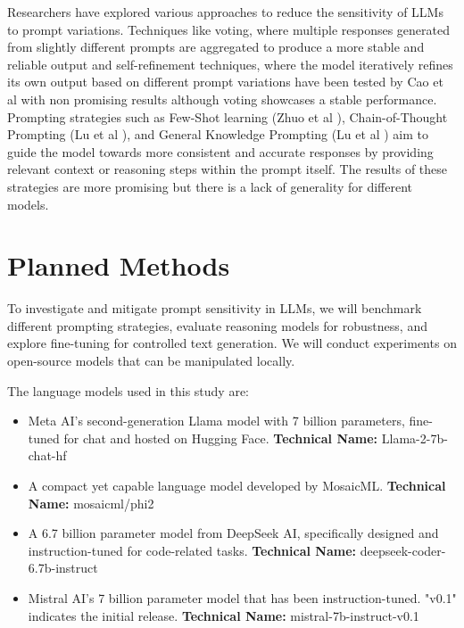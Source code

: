 \documentclass[fleqn,moreauthors,10pt]{ds_report}
\begin{document}
Researchers have explored various approaches to reduce the sensitivity of LLMs to prompt variations. Techniques like voting, where multiple responses generated from slightly different prompts are aggregated to produce a more stable and reliable output and self-refinement techniques, where the model iteratively refines its own output based on different prompt variations have been tested by Cao et al \cite{cao2024worstpromptperformancelarge} with non promising results although voting showcases a stable performance. 
Prompting strategies such as Few-Shot learning (Zhuo et al \cite{zhuo2024prosa}), Chain-of-Thought Prompting (Lu et al \cite{lu2024promptsdifferenttermssensitivity}), and General Knowledge Prompting (Lu et al \cite{lu2024promptsdifferenttermssensitivity}) aim to guide the model towards more consistent and accurate responses by providing relevant context or reasoning steps within the prompt itself. The results of these strategies are more promising but there is a lack of generality for different models.  
	



\section*{Planned Methods}

To investigate and mitigate prompt sensitivity in LLMs, we will benchmark different prompting strategies, evaluate reasoning models for robustness, and explore fine-tuning for controlled text generation. We will conduct experiments on open-source models that can be manipulated locally.

The language models used in this study are:
\begin{itemize}
    \item Meta AI's second-generation Llama model with 7 billion parameters, fine-tuned for chat and hosted on Hugging Face. \textbf{Technical Name:} Llama-2-7b-chat-hf
    \item A compact yet capable language model developed by MosaicML. \textbf{Technical Name:} mosaicml/phi2
    \item A 6.7 billion parameter model from DeepSeek AI, specifically designed and instruction-tuned for code-related tasks. \textbf{Technical Name:} deepseek-coder-6.7b-instruct
    \item Mistral AI's 7 billion parameter model that has been instruction-tuned. "v0.1" indicates the initial release. \textbf{Technical Name:} mistral-7b-instruct-v0.1
\end{itemize}
\end{document}
